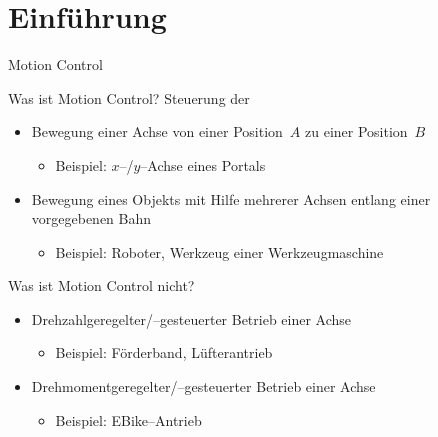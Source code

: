 \section[\thesection \  Einführung]{Einführung}
%
\begin{frame}{Motion Control}
%
\begin{block}{Was ist Motion Control?}
%
Steuerung der
%
\begin{itemize}
  \item Bewegung einer Achse von einer Position~$A$ zu einer
  Position~$B$
  \begin{itemize}
  \item Beispiel: $x$--/$y$--Achse eines Portals
  \end{itemize}
  \item Bewegung eines Objekts mit Hilfe mehrerer Achsen entlang einer
  vorgegebenen Bahn
   \begin{itemize}
  \item Beispiel: Roboter, Werkzeug einer Werkzeugmaschine
  \end{itemize}
\end{itemize}
%
\end{block}
%
%
\begin{block}{Was ist Motion Control nicht?}
%
\begin{itemize}
  \item Drehzahlgeregelter/--gesteuerter Betrieb einer Achse
   \begin{itemize}
  \item Beispiel: Förderband, Lüfterantrieb
  \end{itemize}
  \item Drehmomentgeregelter/--gesteuerter Betrieb einer Achse
     \begin{itemize}
  \item Beispiel: EBike--Antrieb
  \end{itemize}
\end{itemize}
%
\end{block}
%
\end{frame}